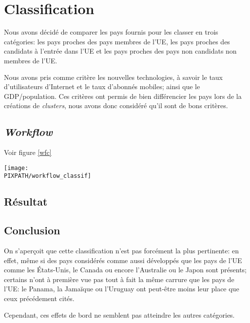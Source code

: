 \vfil
\pagebreak
\section{Classification}

Nous avons décidé de comparer les pays fournis pour
les classer en trois catégories: les pays proches des pays
membres de l'UE, les pays proches des candidats à l'entrée
dans l'UE et les pays proches des pays non candidats non
membres de l'UE.

Nous avons pris comme critère les nouvelles technologies, à savoir
le taux d'utilisateurs d'Internet et le taux d'abonnés mobiles; ainsi
que le GDP/population.
Ces critères ont permis de bien différencier les pays lors de la
créations de {\sl clusters}, nous avons donc considéré qu'il
sont de bons critères.

\subsection{{\sl Workflow}}
Voir figure \ref{wfc}

\begin{sidewaysfigure}[!h]
\begin{center}
    \caption{{\sl Workflow} classification}
    \texttt{[image: \\PIXPATH/workflow\_classif]}
\label{wfc}
\end{center}
\end{sidewaysfigure}


\subsection{Résultat}



\subsection{Conclusion}

On s'aperçoit que cette classification n'est pas forcément
la plus pertinente: en effet, même si des pays considérés comme
aussi développés que les pays de l'UE comme les États-Unis, le Canada
ou encore l'Australie ou le Japon sont présents; certains n'ont à première vue pas
tout à fait la même carrure que les pays de l'UE: le Panama, la Jamaïque
ou l'Uruguay ont peut-être moins leur place que ceux précédement cités. 

Cependant, ces effets de bord ne semblent pas atteindre les autres
catégories.
